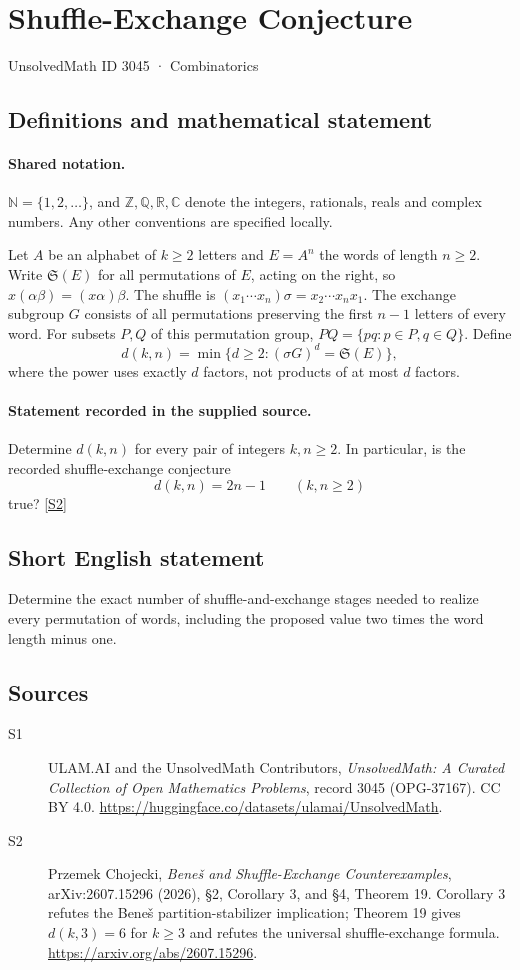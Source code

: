\documentclass[11pt]{article}
\newcommand{\sref}[2]{\hyperlink{source:#1:#2}{[S#2]}}
\begin{document}
\setcounter{section}{3044}
\section{Shuffle-Exchange Conjecture}\label{3045}
{\small\sffamily UnsolvedMath ID 3045 · Combinatorics}
\subsection{Definitions and mathematical statement}

\paragraph{Shared notation.}$\mathbb N=\{1,2,\ldots\}$, and $\mathbb Z,\mathbb Q,\mathbb R,\mathbb C$ denote the integers, rationals, reals and complex numbers. Any other conventions are specified locally.


Let $A$ be an alphabet of $k\geq2$ letters and $E=A^n$ the words of length $n\geq2$. Write $\mathfrak S(E)$ for all permutations of $E$, acting on the right, so $x(\alpha\beta)=(x\alpha)\beta$. The shuffle is $(x_1\cdots x_n)\sigma=x_2\cdots x_nx_1$. The exchange subgroup $G$ consists of all permutations preserving the first $n-1$ letters of every word. For subsets $P,Q$ of this permutation group, $PQ=\{pq:p\in P,q\in Q\}$. Define
\[
 d(k,n)=\min\{d\geq2:(\sigma G)^d=\mathfrak S(E)\},
\]
where the power uses exactly $d$ factors, not products of at most $d$ factors.
\paragraph{Statement recorded in the supplied source.}
Determine $d(k,n)$ for every pair of integers $k,n\geq2$. In particular, is the recorded shuffle-exchange conjecture
\[
 d(k,n)=2n-1\qquad(k,n\geq2)
\]
true? \sref{3045}{2}
\subsection{Short English statement}
Determine the exact number of shuffle-and-exchange stages needed to realize every permutation of words, including the proposed value two times the word length minus one.
\subsection{Sources}
\begin{description}
\item[\hypertarget{source:3045:1}{S1}] ULAM.AI and the UnsolvedMath Contributors, \emph{UnsolvedMath: A Curated Collection of Open Mathematics Problems}, record 3045 (OPG-37167). CC BY 4.0. \url{https://huggingface.co/datasets/ulamai/UnsolvedMath}.
\item[\hypertarget{source:3045:2}{S2}] Przemek Chojecki, \emph{Beneš and Shuffle-Exchange Counterexamples}, arXiv:2607.15296 (2026), §2, Corollary 3, and §4, Theorem 19. Corollary 3 refutes the Beneš partition-stabilizer implication; Theorem 19 gives $d(k,3)=6$ for $k\geq3$ and refutes the universal shuffle-exchange formula. \url{https://arxiv.org/abs/2607.15296}.
\end{description}
\label{end:3045}
\end{document}
